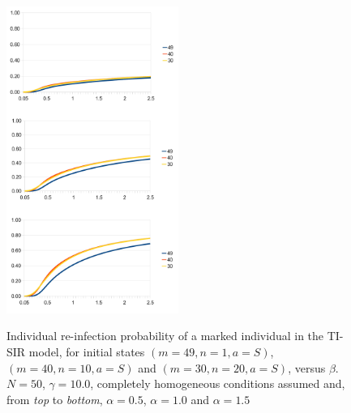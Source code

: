 \documentclass[10pt,A4paper]{article}
\begin{document}
\begin{figure}
 \centering
\includegraphics[width=0.5\textwidth]{Figure6.jpg}
\label{fig:6}
\caption{Individual re-infection probability of a marked individual in the TI-SIR model, for initial states $(m=49,n=1,a=S)$, $(m=40,n=10,a=S)$ and $(m=30,n=20,a=S)$,
versus $\beta$. $N=50$, $\gamma=10.0$, completely homogeneous conditions assumed and, from {\it top} to {\it bottom}, $\alpha=0.5$, $\alpha=1.0$ and
$\alpha=1.5$}
\end{figure}
\end{document}
